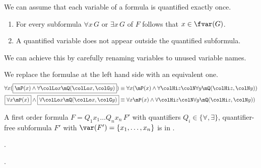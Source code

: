 
\noindent We can assume that each variable of a formula is quantified exactly once.
\begin{enumerate}
	\item For every subformula $\forall x\, G$ or $\exists x\, G$ of $F$ follows that $x\in\fvar(G)$.
	\item A quantified variable does not appear outside the quantified subformula.
\end{enumerate}
We can achieve this by carefully renaming variables to unused variable names.

\begin{example}We replace the formulae at the left hand side with an equivalent one.
	\begin{align*}
	\forall x (\boxed{\mP(x) \land \forall {\colLo x} \mQ({\colLo x}, {\colG y})})
	&\equiv
	\forall x (\mP(x) \land \forall {\colHi z}{\colN \forall y} \mQ({\colHi z}, {\colN y}))
	\\
	\boxed{\forall x \mP(x)} \land \boxed{\forall {\colLo x} \mQ({\colLo x}, {\colG y})}
	&\equiv
	\forall x \mP(x) \land \forall {\colHi z}{\colN \forall y} \mQ({\colHi z}, {\colN y})
	)\\
	\end{align*}
\end{example}

\begin{definition}\label{def:syntax:PNF}
	A first order formula $F = Q_1 x_1 \ldots Q_n x_n\, F'$
	with quantifiers $Q_i\in\{\forall,\exists\}$,
	quantifier-free subformula $F'$ with $\var(F') = \{ x_1,\ldots,x_n \}$
	is in .
\end{definition}

\begin{definition}\label{def:syntax:PNF}
	.
\end{definition}

\begin{definition}\label{def:syntax:PNF}
	.
\end{definition}

